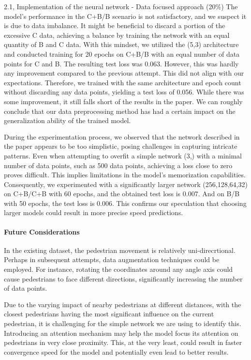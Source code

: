 \begin{task}{2.1, Implementation of the neural network - Data focused approach (20\%)}
The model's performance in the C+B/B scenario is not satisfactory, and we suspect it is due to data imbalance. It might be beneficial to discard a portion of the excessive C data, achieving a balance by training the network with an equal quantity of B and C data. With this mindset, we utilized the (5,3) architecture and conducted training for 20 epochs on C+B/B with an equal number of data points for C and B. The resulting test loss was 0.063. However, this was hardly any improvement compared to the previous attempt. This did not align with our expectations. Therefore, we trained with the same architecture and epoch count without discarding any data points, yielding a test loss of 0.056. While there was some improvement, it still falls short of the results in the paper. We can roughly conclude that our data preprocessing method has had a certain impact on the generalization ability of the trained model.

During the experimentation process, we observed that the network described in the paper appears to be too simplistic, posing challenges in capturing intricate patterns. Even when attempting to overfit a simple network (3,) with a minimal number of data points, such as 500 data points, achieving a loss close to zero proves difficult. This implies limitations in the model's memorization capabilities. Consequently, we experimented with a significantly larger network (256,128,64,32) on C+B/C+B with 60 epochs, and the obtained test loss is 0.007. And on B/B with 50 epochs, the test loss is 0.006. This confirms our speculation that choosing larger models could result in more precise speed predictions.



\paragraph{Future Considerations}
In the existing dataset, the pedestrian movement is relatively uni-direcrtional. Perhaps in subsequent attempts, data augmentation techniques could be employed. For instance, rotating the coordinates around any angle axis could cause pedestrians to face different directions, significantly increasing the number of data points.

Due to the varying impact of nearby pedestrians at different distances, with the closest pedestrians having the most significant influence on the current pedestrian, it is challenging for the simple network we are using to identify this. Introducing an attention mechanism may help the model focus its attention on pedestrians in very close proximity. This, at the very least, could result in faster convergence speed for the model and potentially even lead to better results.




\end{task}
